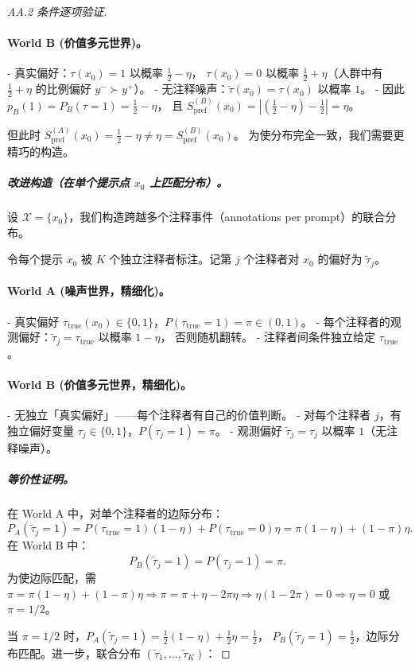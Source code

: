 \documentclass[12pt,a4paper]{article}
\newcommand{\cX}{\mathcal{X}}
\begin{document}
\begin{proof}[AA.2 条件逐项验证]
\paragraph{World B (价值多元世界)。}
- 真实偏好：$\tau(x_0) = 1$ 以概率 $\frac12 - \eta$，
  $\tau(x_0) = 0$ 以概率 $\frac12 + \eta$（人群中有 $\frac12+\eta$ 的比例偏好 $y^-\succ y^+$）。
- 无注释噪声：$\tilde{\tau}(x_0) = \tau(x_0)$ 以概率 $1$。
- 因此 $p_B(1) = P_B(\tau=1) = \frac12 - \eta$，
  且 $S_{\mathrm{pref}}^{(B)}(x_0) = |(\frac12-\eta)-\frac12| = \eta$。

但此时 $S_{\mathrm{pref}}^{(A)}(x_0) = \frac12 - \eta \neq \eta = S_{\mathrm{pref}}^{(B)}(x_0)$。
为使分布完全一致，我们需要更精巧的构造。

\subparagraph{改进构造（在单个提示点 $x_0$ 上匹配分布）。}
设 $\cX=\{x_0\}$，我们构造跨越多个注释事件（annotations per prompt）的联合分布。

令每个提示 $x_0$ 被 $K$ 个独立注释者标注。记第 $j$ 个注释者对 $x_0$ 的偏好为 $\tilde{\tau}_j$。

\paragraph{World A (噪声世界，精细化)。}
- 真实偏好 $\tau_{\mathrm{true}}(x_0) \in \{0,1\}$，$P(\tau_{\mathrm{true}}=1) = \pi \in (0,1)$。
- 每个注释者的观测偏好：$\tilde{\tau}_j = \tau_{\mathrm{true}}$ 以概率 $1-\eta$，
  否则随机翻转。
- 注释者间条件独立给定 $\tau_{\mathrm{true}}$。

\paragraph{World B (价值多元世界，精细化)。}
- 无独立「真实偏好」——每个注释者有自己的价值判断。
- 对每个注释者 $j$，有独立偏好变量 $\tau_j \in \{0,1\}$，$P(\tau_j=1) = \pi$。
- 观测偏好 $\tilde{\tau}_j = \tau_j$ 以概率 $1$（无注释噪声）。

\subparagraph{等价性证明。}
在 World A 中，对单个注释者的边际分布：
\[
P_A(\tilde{\tau}_j=1) = P(\tau_{\mathrm{true}}=1)(1-\eta) + P(\tau_{\mathrm{true}}=0)\eta
= \pi(1-\eta) + (1-\pi)\eta.
\]
在 World B 中：
\[
P_B(\tilde{\tau}_j=1) = P(\tau_j=1) = \pi.
\]
为使边际匹配，需 $\pi = \pi(1-\eta) + (1-\pi)\eta \Rightarrow \pi = \pi + \eta - 2\pi\eta
\Rightarrow \eta(1-2\pi)=0 \Rightarrow \eta=0$ 或 $\pi=1/2$。

当 $\pi=1/2$ 时，$P_A(\tilde{\tau}_j=1) = \frac12(1-\eta) + \frac12\eta = \frac12$，
$P_B(\tilde{\tau}_j=1) = \frac12$，边际分布匹配。进一步，联合分布 $(\tilde{\tau}_1,\dots,\tilde{\tau}_K)$：


\end{proof}
\end{document}
